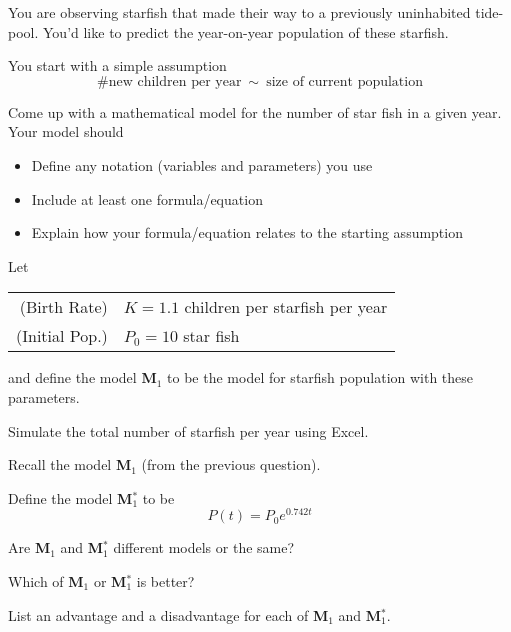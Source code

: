 \documentclass{workbook}
\begin{document}
\begin{slide}
	\question
	You are observing starfish that made their way to a previously uninhabited tide-pool.
	You'd like to predict the year-on-year population of these starfish.

	You start with a simple assumption
	\[
		\# \text{new children per year}\ \sim\ \text{size of current population}
	\]
	\begin{parts}
		\item Come up with a mathematical model for the number of star fish in a given year.
		Your model should
		\begin{itemize}
			\item Define any notation (variables and parameters) you use
			\item Include at least one formula/equation
			\item Explain how your formula/equation relates to the starting assumption
		\end{itemize}
	\end{parts}
\end{slide}

\begin{slide}
	\question
		Let

		\begin{tabular}{rl}
			(Birth Rate) & $K=1.1$ children per starfish per year \\
			(Initial Pop.) & $P_0=10$ star fish
		\end{tabular}

		and define the model \textbf{M$_1$} to be the model for starfish population with
		these parameters.
	\begin{parts}
		\item Simulate the total number of starfish per year using Excel.
	\end{parts}
\end{slide}

\begin{slide}
	\question
	Recall the model \textbf{M$_1$} (from the previous question). 

	Define the model \textbf{M$_1^*$} to be
	\[
		P(t) = P_0 e^{0.742 t}
	\]
	\begin{parts}
		\item Are \textbf{M$_1$} and \textbf{M$_1^*$} different models or the same?
		\item Which of \textbf{M$_1$} or \textbf{M$_1^*$} is better?
		\item List an advantage and a disadvantage for each of \textbf{M$_1$} and \textbf{M$_1^*$}.
	\end{parts}
\end{slide}
\end{document}
